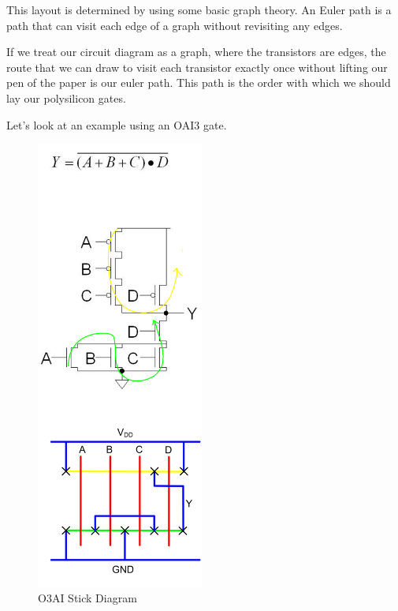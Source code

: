 \documentclass{article}
\begin{document}
This layout is determined by using some basic graph theory. An Euler path is a path that can visit each edge of a graph without revisiting any edges. 

If we treat our circuit diagram as a graph, where the transistors are edges, the route that we can draw to visit each transistor exactly once without lifting our pen of the paper is our euler path. This path is the order with which we should lay our polysilicon gates.

Let's look at an example using an OAI3 gate.

\begin{minipage}{0.5\textwidth}
\begin{figure}[H]
\includegraphics[width=55mm]{OAI3.png}
\caption{O3AI Stick Diagram}
\end{figure}
\end{minipage} \hfill
\end{document}
